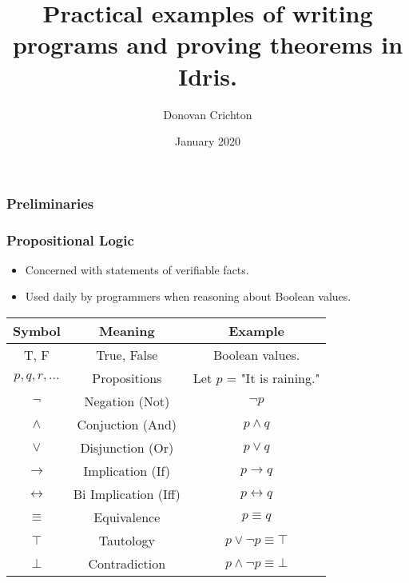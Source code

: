 \documentclass[usenames,dvipsnames]{beamer}
\title{Practical examples of writing programs and proving theorems in Idris.}
\author{Donovan Crichton}
\date{January 2020}
\begin{document}
 
\frame{\titlepage}

\begin{frame}[fragile]
  \frametitle{Preliminaries}

\end{frame}

\begin{frame}[fragile]
  \frametitle{Propositional Logic}
  \begin{itemize}
    \item Concerned with statements of verifiable facts. 
    \item Used daily by programmers when reasoning about Boolean values.
  \end{itemize}
  \begin{tabular}{| c | c | c |}
  \hline
  \textbf{Symbol} & \textbf{Meaning} & \textbf{Example} \\
  \hline
  T, F & True, False & Boolean values. \\
  $p, q, r, ...$  & Propositions & Let $p$ = "It is raining." \\
  $\lnot$ & Negation (Not) & $\lnot p$ \\
  $\land$ & Conjuction (And) & $p \land q$ \\
  $\lor$ & Disjunction (Or) & $p \lor q$ \\
  $\rightarrow$ & Implication (If) & $p \rightarrow q$ \\
  $\leftrightarrow$ & Bi Implication (Iff) & $p \leftrightarrow q$ \\
  $\equiv$ & Equivalence & $p \equiv q$ \\
  $\top$ & Tautology & $p \lor \lnot p \equiv \top$ \\
  $\bot$ & Contradiction & $p \land \lnot p \equiv \bot$ \\
  \hline
  \end{tabular}
\end{frame}
\end{document}
